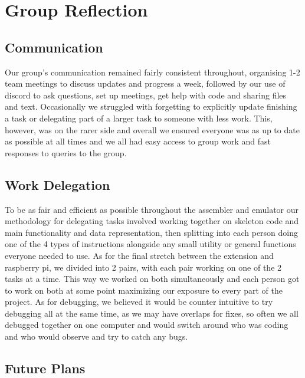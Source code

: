 \documentclass{article}
\begin{document}
\section{Group Reflection}

\subsection{Communication}

Our group's communication remained fairly consistent throughout, organising 1-2 team meetings to discuss updates and progress a week, followed by our use of discord to ask questions, set up meetings, get help with code and sharing files and text. Occasionally we struggled with forgetting to explicitly update finishing a task or delegating part of a larger task to someone with less work. This, however, was on the rarer side and overall we ensured everyone was as up to date as possible at all times and we all had easy access to group work and fast responses to queries to the group.

\subsection{Work Delegation}

To be as fair and efficient as possible throughout the assembler and emulator our methodology for delegating tasks involved working together on skeleton code and main functionality and data representation, then splitting into each person doing one of the 4 types of instructions alongside any small utility or general functions everyone needed to use. As for the final stretch between the extension and raspberry pi, we divided into 2 pairs, with each pair working on one of the 2 tasks at a time. This way we worked on both simultaneously and each person got to work on both at some point maximizing our exposure to every part of the project. As for debugging, we believed it would be counter intuitive to try debugging all at the same time, as we may have overlaps for fixes, so often we all debugged together on one computer and would switch around who was coding and who would observe and try to catch any bugs.

\subsection{Future Plans}
\end{document}
